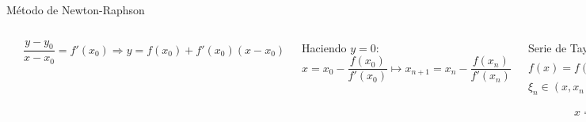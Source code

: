 \documentclass[9pt, aspectratio=169]{beamer}
\begin{document}
\begin{frame}{Método de Newton-Raphson}
  \begin{columns}[c]
    \cx
    \begin{overprint}
       \includegraphics{figs/newton-01.pdf}
       \includegraphics{figs/newton-02.pdf}
    \end{overprint}

    \cx
    \[ \frac{y - y_0}{x - x_0} = f'(x_0) \Rightarrow  y = f(x_0) + f'(x_0) (x - x_0) \]

    Haciendo $y = 0$:
    \[x = x_0 - \frac{f(x_0)}{f'(x_0)} \mapsto  x_{n+1} = x_{n} - \frac{f(x_n)}{f'(x_n)}\]
    \pause

    \begin{overprint}
       {
        Serie de Taylor ($x_n \approx x*$):
        \[f(x) = f(x_n) + (x - x_n) f'(x_n) + \frac{1}{2} (x - x_n)^2 f''(\xi) \]
        $\xi_n \in (x, x_n)$ Hacemos $f(x) = 0$:
        \[ x = x_n - \frac{f(x_n)}{f'(x_n)} - \frac{1}{2} (x - x_n)^2 \frac{f''(\xi_n)}{f'(x_n)} \]
        \[ \mapsto x_{n+1} = x_n - \frac{f(x_n)}{f'(x_n)} \]
      }
    \end{overprint}
  \end{columns}
\end{frame}
\end{document}
